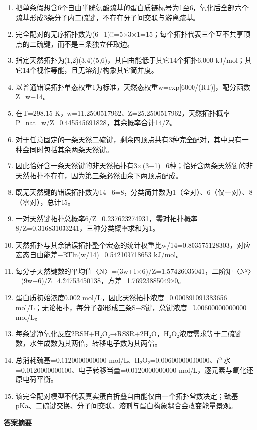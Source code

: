 \documentclass[UTF8,11pt,a4paper]{ctexart}
\begin{document}
\begin{enumerate}
\item 把单条假想含6个自由半胱氨酸巯基的蛋白质链标号为1至6，氧化后全部六个巯基形成3条分子内二硫键，不存在分子间交联与游离巯基。
\item 完全配对的无序拓扑数为(6−1)!!=5×3×1=15；每个拓扑代表三个互不共享顶点的二硫键，而不是三条独立任取边。
\item 指定天然拓扑为(1,2)(3,4)(5,6)，其自由能低于其它14个拓扑6.000 kJ/mol；其它14个视作等能，且无溶剂/构象其它简并度。
\item 以普通错误拓扑单态权重1为标准，天然态权重w=exp[6000/(RT)]，配分函数Z=w+14。
\item 在T=298.15 K，w=11.2500517962、Z=25.2500517962，天然拓扑概率P\_nat=w/Z=0.445545691828，其余概率合计14/Z。
\item 对于任意固定的一条天然二硫键，剩余四顶点共有3种完全配对，其中只有一种会同时包括其余两条天然键。
\item 因此恰好含一条天然键的非天然拓扑有3×(3−1)=6种；恰好含两条天然键的非天然拓扑不存在，因为第三条必然由余下两顶点配成。
\item 既无天然键的错误拓扑数为14−6=8，分类简并数为1（全对）、6（仅一对）、8（零对），总计15。
\item 一对天然键拓扑总概率6/Z=0.237623274931，零对拓扑概率8/Z=0.316831033241，三种分类概率求和为1。
\item 天然拓扑与其余错误拓扑整个宏态的统计权重比w/14=0.803575128303，对应宏态自由能差−RTln(w/14)=0.542109718653 kJ/mol。
\item 每分子天然键数的平均值〈N〉=(3w+1×6)/Z=1.57426035041，二阶矩〈N²〉=(9w+6)/Z=4.24753450138，方差=1.76923885049≥0。
\item 蛋白质初始浓度0.002 mol/L，因此天然拓扑浓度=0.000891091383656 mol/L；无论拓扑，每分子都形成三条S−S键，总键浓度=0.00600000000000 mol/L。
\item 每条键净氧化反应2RSH+H₂O₂→RSSR+2H₂O，H₂O₂浓度需求等于二硫键数，水生成数为其两倍，转移电子数为其两倍。
\item 总消耗巯基=0.0120000000000 mol/L、H₂O₂=0.00600000000000、产水=0.0120000000000、电子转移当量=0.0120000000000 mol/L，逐元素与氧化还原电荷平衡。
\item 该完全配对模型不代表真实蛋白折叠自由能仅由一个拓扑常数决定；巯基pKa、二硫键交换、分子间交联、溶剂与蛋白构象耦合会改变能量景观。
\end{enumerate}
\noindent\textbf{答案摘要}\par
\end{document}
